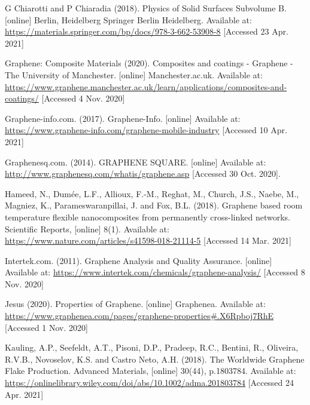 \documentclass[a4paper,12pt]{article}
\numberwithin{equation}{section}
\numberwithin{figure}{section}
\begin{document}
\noindent G Chiarotti and P Chiaradia (2018). Physics of Solid Surfaces Subvolume B. [online] Berlin, Heidelberg Springer Berlin Heidelberg. Available at: \url{https://materials.springer.com/bp/docs/978-3-662-53908-8} [Accessed 23 Apr. 2021]\vspace{\baselineskip}

\noindent Graphene: Composite Materials (2020). Composites and coatings - Graphene - The University of Manchester. [online] Manchester.ac.uk. Available at: \url{https://www.graphene.manchester.ac.uk/learn/applications/composites-and-coatings/} [Accessed 4 Nov. 2020]\vspace{\baselineskip}

\noindent Graphene-info.com. (2017). Graphene-Info. [online] Available at: \url{https://www.graphene-info.com/graphene-mobile-industry} [Accessed 10 Apr. 2021]\vspace{\baselineskip}

\noindent Graphenesq.com. (2014). GRAPHENE SQUARE. [online] Available at: \url{http://www.graphenesq.com/whatis/graphene.asp} [Accessed 30 Oct. 2020].\vspace{\baselineskip}

\noindent Hameed, N., Dumée, L.F., Allioux, F.-M., Reghat, M., Church, J.S., Naebe, M., Magniez, K., Parameswaranpillai, J. and Fox, B.L. (2018). Graphene based room temperature flexible nanocomposites from permanently cross-linked networks. Scientific Reports, [online] 8(1). Available at: \url{https://www.nature.com/articles/s41598-018-21114-5} [Accessed 14 Mar. 2021]\vspace{\baselineskip}

\noindent Intertek.com. (2011). Graphene Analysis and Quality Assurance. [online] Available at: \url{https://www.intertek.com/chemicals/graphene-analysis/} [Accessed 8 Nov. 2020]\vspace{\baselineskip}

\noindent Jesus (2020). Properties of Graphene. [online] Graphenea. Available at: \url{ https://www.graphenea.com/pages/graphene-properties\#.X6Rpboj7RhE} [Accessed 1 Nov. 2020]\vspace{\baselineskip}

\noindent Kauling, A.P., Seefeldt, A.T., Pisoni, D.P., Pradeep, R.C., Bentini, R., Oliveira, R.V.B., Novoselov, K.S. and Castro Neto, A.H. (2018). The Worldwide Graphene Flake Production. Advanced Materials, [online] 30(44), p.1803784. Available at: \url{https://onlinelibrary.wiley.com/doi/abs/10.1002/adma.201803784} [Accessed 24 Apr. 2021]\vspace{\baselineskip}
\end{document}
